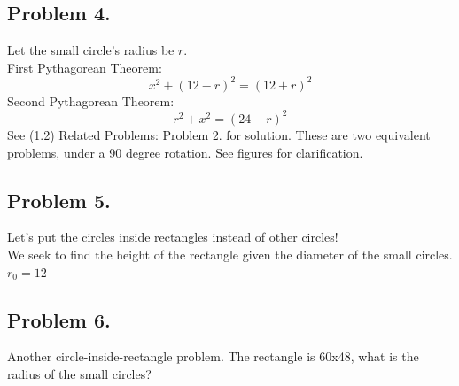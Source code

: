 \documentclass{article}
\begin{document}
\subsection{Problem 4.}
Let the small circle's radius be $r$.\\
First Pythagorean Theorem:
\begin{equation}
    x^2 + (12 - r)^2 = (12 + r)^2
\end{equation}
Second Pythagorean Theorem:
\begin{equation}
    r^2 + x^2 = (24-r)^2
\end{equation}
See (1.2) Related Problems: Problem 2. for solution. These are two equivalent problems, under a 90 degree rotation. See figures for clarification.

\subsection{Problem 5.}
Let's put the circles inside rectangles instead of other circles!\\
We seek to find the height of the rectangle given the diameter of the small circles.\\
$r_0 = 12$

\subsection{Problem 6.}
Another circle-inside-rectangle problem. The rectangle is 60x48, what is the radius of the small circles?
\end{document}
